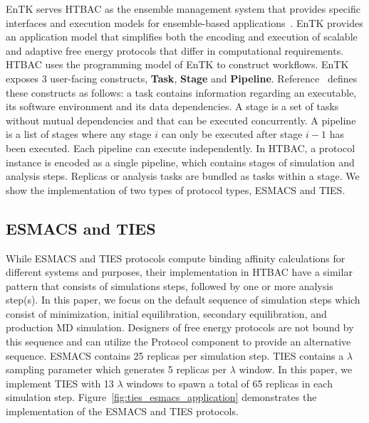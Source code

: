 EnTK serves HTBAC as the ensemble management system that provides specific
interfaces and execution models for ensemble-based
applications~\cite{power-of-many17}. EnTK provides an application model that
simplifies both the encoding and execution of scalable and adaptive free
energy protocols that differ in computational requirements. HTBAC uses the
programming model of EnTK to construct workflows. EnTK exposes 3 user-facing
constructs, \textbf{Task}, \textbf{Stage} and \textbf{Pipeline}.
Reference~\cite{power-of-many17} defines these constructs as follows: a task
contains information regarding an executable, its software environment and
its data dependencies. A stage is a set of tasks without mutual dependencies
and that can be executed concurrently. A pipeline is a list of stages where
any stage $i$ can only be executed after stage $i - 1$ has been executed.
Each pipeline can execute independently. In HTBAC, a protocol instance is
encoded as a single pipeline, which contains stages of simulation and
analysis steps. Replicas or analysis tasks are bundled as tasks within a
stage. We show the implementation of two types of protocol types, ESMACS and
TIES.

\subsection{ESMACS and TIES}

While ESMACS and TIES protocols compute binding affinity calculations for
different systems and purposes, their implementation in HTBAC have a similar
pattern that consists of simulations steps, followed by one or more analysis
step(s). In this paper, we focus on the default sequence of simulation steps
which consist of minimization, initial equilibration, secondary
equilibration, and production MD simulation. Designers of free energy
protocols are not bound by this sequence and can utilize the Protocol
component to provide an alternative sequence. ESMACS contains 25 replicas per
simulation step. TIES contains a $\lambda$ sampling parameter which generates
5 replicas per $\lambda$ window. In this paper, we implement TIES with 13
$\lambda$ windows to spawn a total of 65 replicas in each simulation step.
Figure~\ref{fig:ties_esmacs_application} demonstrates the implementation of the
ESMACS and TIES protocols.

